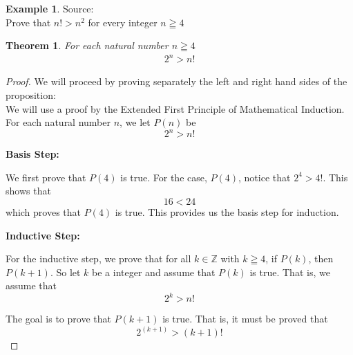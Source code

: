 \documentclass{book}
\newtheorem{theorem}{Theorem}[section]
\theoremstyle{definition}
\newtheorem{example}{Example}[definition]
\theoremstyle{remark}
\newcommand{\bb}[1]{\mathbb{#1}}
\begin{document}
\newpage
\begin{example}
Source: \cite[Chap.2, S.2.3, Ex.1]{ross} \\ 

Prove that $n! > n^2$ for every integer $n \geqq 4$
\begin{tcolorbox}
    \begin{theorem}
        For each natural number $n \geqq 4$
        \begin{align*}
            2^n > n!                
        \end{align*}
    \end{theorem}
\end{tcolorbox}

\begin{proof}
    We will proceed by proving separately the left and right hand sides of the proposition: \\
    

        We will use a proof by the Extended First Principle of Mathematical Induction. For each natural number $n$, we let $P(n)$ be
            \begin{equation*}
                2^n > n!
            \end{equation*}
        
        \begin{flushleft} \textbf{Basis Step:} \end{flushleft}
            We first prove that $P(4)$ is true. For the case, $P(4)$, notice that $2^4 > 4!$. This shows that   
                \begin{equation*}
                     16 < 24
                \end{equation*}
            which proves that $P(4)$ is true. This provides us the basis step for induction. \\ 
        
        \begin{flushleft} \textbf{Inductive Step:} \end{flushleft}
            For the inductive step, we prove that for all $k \in \bb{Z}$ with $k \geqq 4$, if $P(k)$, then $P(k+1)$. So let $k$ be a integer and assume that $P(k)$ is true. That is, we assume that 
                \begin{equation*}
                   2^k > n!
                \end{equation*}
            
            The goal is to prove that $P(k+1)$ is true. That is, it must be proved that  
                \begin{equation}
                    2^(k+1) > (k+1)! 
                \end{equation}
            

\end{proof}
\end{example}
\end{document}

